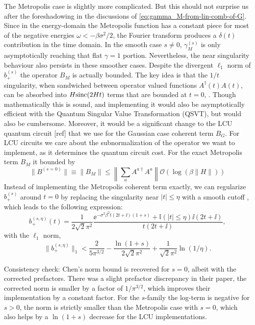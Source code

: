 The Metropolis case is slightly more complicated. But this should not surprise us after the foreshadowing in the discussions of \eqref{eq:gamma_M-from-lin-comb-of-G}. Since in the energy-domain the Metropolis function has a constant piece for most of the negative energies $\omega < -\beta\sigma^2 / 2$, the Fourier transform produces a $\delta(t)$ contribution in the time domain. In the smooth case $s \neq 0$, $\gamma_M^{(s)}$ is only asymptotically reaching that flat $\gamma = 1$ portion. Nevertheless, the near singularity behaviour also persists in these smoother cases. Despite the divergent $\ell_1$ norm of $b_+^{(s)}$ the operator $B_M$ is actually bounded. The key idea is that the $1/t$ singularity, when sandwiched between operator valued functions $A^\dagger(t)A(t)$, can be absorbed into $H \textup{sinc}(2Ht)$ terms that are bounded at $t=0$, \cite[Proposition B.2]{chen2023efficient}. Though mathematically this is sound, and implementing it would also be asymptotically efficient with the Quantum Singular Value Transformation (QSVT), but would also be cumbersome. Moreover, it would be a significant change to the LCU quantum circuit [ref] that we use for the Gaussian case coherent term $B_G$. 
For LCU circuits we care about the subnormalization of the operator we want to implement, as it determines the quantum circuit cost. For the exact Metropolis term $B_M$ it bounded by \cite[Proposition B.2]{chen2023efficient}
\begin{equation}
    \|B^{(s=0)}\| \equiv\|B_M\| \leq \left\|\sum_a A^{a\dagger}A^a\right\| \mathcal{O}\left(\log\left(\beta \| H \|\right)\right)
\end{equation}
Instead of implementing the Metropolis coherent term exactly, we can regularize $b_+^{(s)}$ around $t=0$ by replacing the singularity near $|t|\leq\eta$ with a smooth cutoff \cite[Proposition B.1]{chen2023efficient}, which leads to the following expression:
\begin{equation} \label{eq:b_plus-s-eta}
    b_+^{(s, \eta)}(t) = \frac{1}{2\sqrt{2}\pi^2}\frac{\ee^{-\sigma^2\beta^2 t(2t + \ii)(1 + s)} + \mathbb{I}(|t|\leq\eta)\ii(2t + \ii)}{t(2t + \ii)}, 
\end{equation}
with the $\ell_1$ norm, 
$$
\|b_+^{(s, \eta)}\|_1 < \frac{2}{5 \pi^{3/2}} - \frac{\ln(1 + s)}{2\sqrt{2}\pi^2}+ \frac{1}{\sqrt{2}\pi^2}\ln(1 / \eta).
$$

Consistency check: Chen's norm bound is recovered for $s=0$, albeit with the corrected prefactors. There was a slight prefactor discrepancy in their paper, the corrected norm is smaller by a factor of $1 / \pi^{3 / 2}$, which improves their implementation by a constant factor. For the $s$-family the log-term is negative for $s > 0$, the norm is strictly smaller than the Metropolis case with $s = 0$, which also helps by a $\ln(1 + s)$ decrease for the LCU implementations. 

